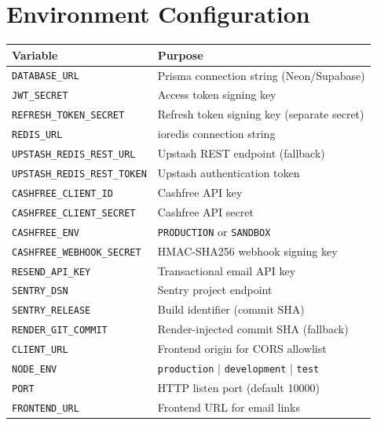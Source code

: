 \documentclass[11pt,a4paper,twoside]{book}
\newcommand{\th}[1]{\textbf{\color{white}#1}}
\begin{document}
\section{Environment Configuration}

\begin{center}\small
\begin{tabular}{p{5cm}p{7.5cm}}
\toprule
\rowcolor{headbg}\th{Variable} & \th{Purpose} \\
\midrule
\texttt{DATABASE\_URL}          & Prisma connection string (Neon/Supabase) \\
\rowcolor{rowalt}\texttt{JWT\_SECRET}            & Access token signing key \\
\texttt{REFRESH\_TOKEN\_SECRET} & Refresh token signing key (separate secret) \\
\rowcolor{rowalt}\texttt{REDIS\_URL}             & ioredis connection string \\
\texttt{UPSTASH\_REDIS\_REST\_URL} & Upstash REST endpoint (fallback) \\
\rowcolor{rowalt}\texttt{UPSTASH\_REDIS\_REST\_TOKEN} & Upstash authentication token \\
\texttt{CASHFREE\_CLIENT\_ID}   & Cashfree API key \\
\rowcolor{rowalt}\texttt{CASHFREE\_CLIENT\_SECRET} & Cashfree API secret \\
\texttt{CASHFREE\_ENV}          & \texttt{PRODUCTION} or \texttt{SANDBOX} \\
\rowcolor{rowalt}\texttt{CASHFREE\_WEBHOOK\_SECRET} & HMAC-SHA256 webhook signing key \\
\texttt{RESEND\_API\_KEY}       & Transactional email API key \\
\rowcolor{rowalt}\texttt{SENTRY\_DSN}            & Sentry project endpoint \\
\texttt{SENTRY\_RELEASE}        & Build identifier (commit SHA) \\
\rowcolor{rowalt}\texttt{RENDER\_GIT\_COMMIT}    & Render-injected commit SHA (fallback) \\
\texttt{CLIENT\_URL}            & Frontend origin for CORS allowlist \\
\rowcolor{rowalt}\texttt{NODE\_ENV}              & \texttt{production} | \texttt{development} | \texttt{test} \\
\texttt{PORT}                   & HTTP listen port (default 10000) \\
\rowcolor{rowalt}\texttt{FRONTEND\_URL}          & Frontend URL for email links \\
\bottomrule
\end{tabular}
\end{center}
\end{document}
